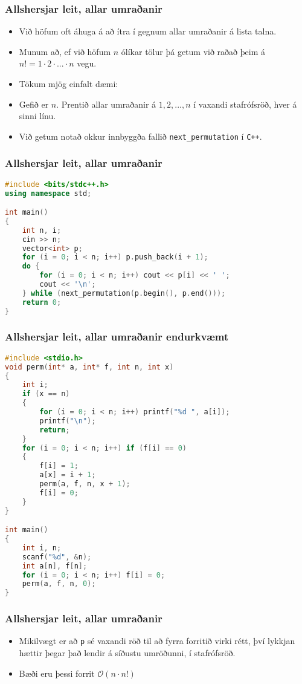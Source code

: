 \documentclass{beamer}
\renewcommand\O{\mathcal{O}}
\begin{document}
\begin{frame}
	\frametitle{Allshersjar leit, allar umraðanir}
\begin{itemize}
	\item<1-> Við höfum oft áhuga á að ítra í gegnum allar umraðanir á lista talna.
	\item<2-> Munum að, ef við höfum $n$ ólíkar tölur þá getum við raðað þeim á $n! = 1 \cdot 2 \cdot ... \cdot n$ vegu.
	\item<3-> Tökum mjög einfalt dæmi:
	\item<4-> Gefið er $n$. Prentið allar umraðanir á $1, 2, ..., n$ í vaxandi stafrófsröð, hver á sinni línu.
	\item<5-> Við getum notað okkur innbyggða fallið \texttt{next\_permutation} í \texttt{C++}.
\end{itemize}
\end{frame}

\begin{frame}[fragile]
	\frametitle{Allshersjar leit, allar umraðanir}
\tiny
\begin{lstlisting}[language=C++]
#include <bits/stdc++.h>
using namespace std;

int main()
{
	int n, i;
	cin >> n;
	vector<int> p;
	for (i = 0; i < n; i++) p.push_back(i + 1);
	do {
		for (i = 0; i < n; i++) cout << p[i] << ' ';
		cout << '\n';
	} while (next_permutation(p.begin(), p.end()));
	return 0;
}
\end{lstlisting}
\end{frame}

\begin{frame}[fragile]
	\frametitle{Allshersjar leit, allar umraðanir endurkvæmt}
\tiny
\begin{lstlisting}[language=C]
#include <stdio.h>
void perm(int* a, int* f, int n, int x)
{
	int i;
	if (x == n)
	{
		for (i = 0; i < n; i++) printf("%d ", a[i]);
		printf("\n");
		return;
	}
	for (i = 0; i < n; i++) if (f[i] == 0)
	{
		f[i] = 1;
		a[x] = i + 1;
		perm(a, f, n, x + 1);
		f[i] = 0;
	}
}

int main()
{
	int i, n;
	scanf("%d", &n);
	int a[n], f[n];
	for (i = 0; i < n; i++) f[i] = 0;
	perm(a, f, n, 0);
}
\end{lstlisting}
\end{frame}

\begin{frame}
	\frametitle{Allshersjar leit, allar umraðanir}
\begin{itemize}
	\item<1-> Mikilvægt er að \texttt{p} sé vaxandi röð til að fyrra forritið virki rétt, því lykkjan hættir þegar það lendir á síðustu umröðunni,
		í stafrófsröð.
	\item<2-> Bæði eru þessi forrit $\O(n\cdot n!)$
\end{itemize}
\end{frame}
\end{document}
